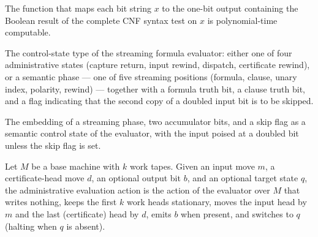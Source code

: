 \begin{lemma}
\label{Complexity.satSyntax_poly}
\leanok
{}
The function that maps each bit string $x$ to the one-bit output containing the Boolean
result of the complete CNF syntax test on $x$ is polynomial-time computable.
\end{lemma}
\begin{definition}
\label{Complexity.SatEvalControl}
\leanok
The control-state type of the streaming formula evaluator: either one of four
administrative states (capture return, input rewind, dispatch, certificate rewind),
or a semantic phase — one of five streaming positions (formula, clause, unary index,
polarity, rewind) — together with a formula truth bit, a clause truth bit, and a
flag indicating that the second copy of a doubled input bit is to be skipped.
\end{definition}

\begin{definition}
\label{Complexity.satEvalQ}
\leanok
{}
The embedding of a streaming phase, two accumulator bits, and a skip flag as a
semantic control state of the evaluator, with the input poised at a doubled bit
unless the skip flag is set.
\end{definition}

\begin{definition}
\label{Complexity.satEvalAction}
\leanok
{}
Let $M$ be a base machine with $k$ work tapes. Given an input move $m$, a
certificate-head move $d$, an optional output bit $b$, and an optional target
state $q$, the administrative evaluation action is the action of the evaluator
over $M$ that writes nothing, keeps the first $k$ work heads stationary, moves the
input head by $m$ and the last (certificate) head by $d$, emits $b$ when present,
and switches to $q$ (halting when $q$ is absent).
\end{definition}

